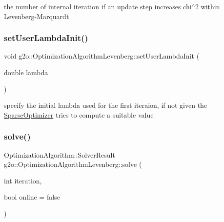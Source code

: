 the number of internal iteration if an update step increases chi$^\wedge$2 within Levenberg-\/\+Marquardt 

\mbox{\label{classg2o_1_1_optimization_algorithm_levenberg_a9388e5e7800b18acb0db0a9a7be031a6}} 
\subsubsection{\texorpdfstring{set\+User\+Lambda\+Init()}{setUserLambdaInit()}}
{\footnotesize\ttfamily void g2o\+::\+Optimization\+Algorithm\+Levenberg\+::set\+User\+Lambda\+Init (\begin{DoxyParamCaption}\item[{double}]{lambda }\end{DoxyParamCaption})}



specify the initial lambda used for the first iteraion, if not given the \mbox{\hyperlink{classg2o_1_1_sparse_optimizer}{Sparse\+Optimizer}} tries to compute a suitable value 

\mbox{\label{classg2o_1_1_optimization_algorithm_levenberg_a7140fa989b54eac4e09ba17829dcada0}} 
\subsubsection{\texorpdfstring{solve()}{solve()}}
{\footnotesize\ttfamily Optimization\+Algorithm\+::\+Solver\+Result g2o\+::\+Optimization\+Algorithm\+Levenberg\+::solve (\begin{DoxyParamCaption}\item[{int}]{iteration,  }\item[{bool}]{online = {\ttfamily false} }\end{DoxyParamCaption})\hspace{0.3cm}{\ttfamily [virtual]}}

